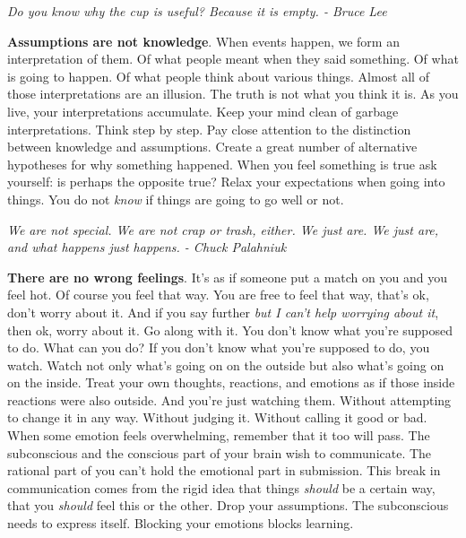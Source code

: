 \documentclass[a4paper,hidelinks]{article}
\begin{document}
\newpage

\begin{center}
\textit{
Do you know why the cup is useful? Because it is empty. - Bruce Lee
}
\end{center}

\textbf{Assumptions are not knowledge}.
When events happen, we form an interpretation of them.
Of what people meant when they said something.
Of what is going to happen.
Of what people think about various things.
Almost all of those interpretations are an illusion.
The truth is not what you think it is.
As you live, your interpretations accumulate.
Keep your mind clean of garbage interpretations.
Think step by step.
Pay close attention to the distinction between knowledge and assumptions.
Create a great number of alternative hypotheses for why something happened.
When you feel something is true ask yourself: is perhaps the opposite true?
Relax your expectations when going into things.
You do not \textit{know} if things are going to go well or not.

\newpage

\begin{center}
\textit{
We are not special. We are not crap or trash, either. We just are. We just are, and what happens just happens. - Chuck Palahniuk
}
\end{center}

\textbf{There are no wrong feelings}.
It's as if someone put a match on you and you feel hot.
Of course you feel that way.
You are free to feel that way, that's ok, don't worry about it.
And if you say further \textit{but I can't help worrying about it}, then ok, worry about it.
Go along with it.
You don't know what you're supposed to do.
What can you do?
If you don't know what you're supposed to do, you watch.
Watch not only what's going on on the outside but also what's going on on the inside.
Treat your own thoughts, reactions, and emotions as if those inside reactions were also outside.
And you're just watching them.
Without attempting to change it in any way.
Without judging it.
Without calling it good or bad.
When some emotion feels overwhelming, remember that it too will pass.
The subconscious and the conscious part of your brain wish to communicate.
The rational part of you can't hold the emotional part in submission.
This break in communication comes from the rigid idea that things \textit{should} be a certain way, that you \textit{should} feel this or the other.
Drop your assumptions.
The subconscious needs to express itself.
Blocking your emotions blocks learning.
\end{document}
